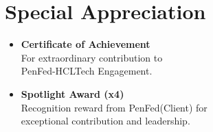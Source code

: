 \section{Special Appreciation}
\begin{minipage}[t]{0.45\textwidth}
\begin{itemize}
\item \textbf{Certificate of Achievement}\\
For extraordinary contribution to\\
PenFed-HCLTech Engagement.
\end{itemize}
\end{minipage}\hfill
\begin{minipage}[t]{0.5\textwidth}
\begin{itemize}
\item \textbf{Spotlight Award (x4)}\\
Recognition reward from PenFed(Client) for \\
exceptional contribution and leadership.
\end{itemize}
\end{minipage}\hfill
